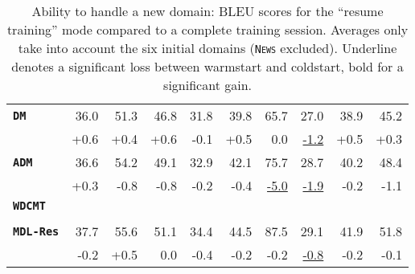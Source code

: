 \documentclass[11pt,a4paper]{article}
\newcommand{\fyTodo}[1]{\Todo[FY:]{\textcolor{orange}{#1}}}
\newcommand{\fyDone}[1]{\done[FY]\Todo[FY:]{\textcolor{orange}{#1}}}
\newcommand{\domain}[1]{\texttt{\textsc{#1}}}
\newcommand{\system}[1]{\texttt{\textbf{#1}}}
\newcommand{\SW}[1]{\underline{#1}}
\begin{document}
\begin{table*}
\begin{tabular}{|p{2.5cm}|*{9}{r|}}
    \system{DM}            &36.0 &51.3&46.8&31.8&39.8&65.7&27.0 & 38.9 & 45.2\\[-2pt]
                   & \scriptsize +0.6& \scriptsize +0.4& \scriptsize +0.6& \scriptsize -0.1& \scriptsize +0.5 & \scriptsize 0.0& \scriptsize \SW{-1.2}& \scriptsize +0.5 & \scriptsize +0.3\\    
    
    \system{ADM}          &36.6&54.2&49.1&32.9&42.1&75.7&28.7 & 40.2 & 48.4 \\[-2pt]
                   & \scriptsize +0.3 & \scriptsize -0.8 & \scriptsize -0.8 & \scriptsize -0.2 & \scriptsize -0.4 & \scriptsize \SW{-5.0} & \scriptsize \SW{-1.9} & \scriptsize -0.2 & \scriptsize -1.1\\
    
    \system{WDCMT}     &&&&&&& & &\\[-2pt]
                    &&&&&&&&& \\

    \system{MDL-Res}    &37.7   & 55.6   & 51.1   & 34.4  & 44.5  & 87.5  & 29.1 & 41.9 & 51.8 \\[-2pt]
                        & \scriptsize -0.2 & \scriptsize +0.5 & \scriptsize 0.0 & \scriptsize -0.4  &  \scriptsize -0.2 & \scriptsize -0.2 & \scriptsize \SW{-0.8} & \scriptsize -0.2 & \scriptsize -0.1 \\
     \hline
  \end{tabular}
  \caption{Ability to handle a new domain: BLEU scores for the ``resume training'' mode compared to a complete training session. Averages only take into account the six initial domains (\domain{News} excluded). Underline denotes a significant loss between warmstart and coldstart, bold for a significant gain.}
  \label{tab:warmrestart}
  \fyTodo{Fill the table, significancy testing against initial learning condition, for each domain, and averages ? }
  \fyDone{Need correct number / differences for Mixed-Nat}
  \fyDone{averages include one more domain ? No for comparison}
  \fyDone{i used smaller number for differences (easier to read...)}
\end{table*}
\end{document}
